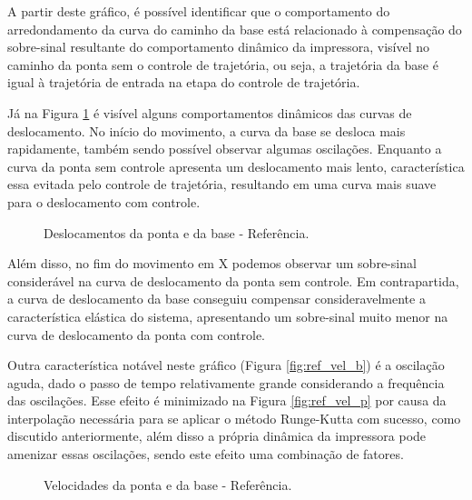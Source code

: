A partir deste gráfico, é possível identificar que o comportamento do arredondamento da curva do caminho da base está relacionado à compensação do sobre-sinal resultante do comportamento dinâmico da impressora, visível no caminho da ponta sem o controle de trajetória, ou seja, a trajetória da base é igual à trajetória de entrada na etapa do controle de trajetória.

Já na Figura \ref{fig:ref_des} é visível alguns comportamentos dinâmicos das curvas de deslocamento. No início do movimento, a curva da base se desloca mais rapidamente, também sendo possível observar algumas oscilações. Enquanto a curva da ponta sem controle apresenta um deslocamento mais lento, característica essa evitada pelo controle de trajetória, resultando em uma curva mais suave para o deslocamento com controle.

\begin{figure}[H]
    \centering
    \hfill
    \caption{Deslocamentos da ponta e da base - Referência.}
    \label{fig:ref_des}
\end{figure}

Além disso, no fim do movimento em X podemos observar um sobre-sinal considerável na curva de deslocamento da ponta sem controle. Em contrapartida, a curva de deslocamento da base conseguiu compensar consideravelmente a característica elástica do sistema, apresentando um sobre-sinal muito menor na curva de deslocamento da ponta com controle.

Outra característica notável neste gráfico (Figura \ref{fig:ref_vel_b}) é a oscilação aguda, dado o passo de tempo relativamente grande considerando a frequência das oscilações. Esse efeito é minimizado na Figura \ref{fig:ref_vel_p} por causa da interpolação necessária para se aplicar o método Runge-Kutta com sucesso, como discutido anteriormente, além disso a própria dinâmica da impressora pode amenizar essas oscilações, sendo este efeito uma combinação de fatores.

\begin{figure}[H]
    \centering
    \hfill
    \caption{Velocidades da ponta e da base - Referência.}
    \label{fig:ref_vel}
\end{figure}

